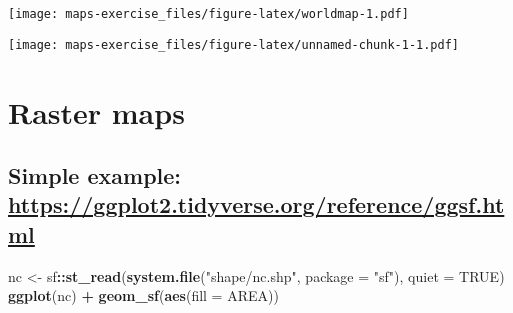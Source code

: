 \documentclass[
]{article}
\newenvironment{Shaded}{\begin{snugshade}}{\end{snugshade}}
\newcommand{\AttributeTok}[1]{\textcolor[rgb]{0.13,0.29,0.53}{#1}}
\newcommand{\CommentTok}[1]{\textcolor[rgb]{0.56,0.35,0.01}{\textit{#1}}}
\newcommand{\ConstantTok}[1]{\textcolor[rgb]{0.56,0.35,0.01}{#1}}
\newcommand{\FunctionTok}[1]{\textcolor[rgb]{0.13,0.29,0.53}{\textbf{#1}}}
\newcommand{\NormalTok}[1]{#1}
\newcommand{\OtherTok}[1]{\textcolor[rgb]{0.56,0.35,0.01}{#1}}
\newcommand{\SpecialCharTok}[1]{\textcolor[rgb]{0.81,0.36,0.00}{\textbf{#1}}}
\newcommand{\StringTok}[1]{\textcolor[rgb]{0.31,0.60,0.02}{#1}}
\begin{document}
\texttt{[image: maps-exercise\_files/figure-latex/worldmap-1.pdf]}

\begin{Shaded}
\end{Shaded}

\texttt{[image: maps-exercise\_files/figure-latex/unnamed-chunk-1-1.pdf]}

\hypertarget{raster-maps}{%
\section{Raster maps}\label{raster-maps}}

\hypertarget{simple-example-httpsggplot2.tidyverse.orgreferenceggsf.html}{%
\subsection{\texorpdfstring{Simple example:
\url{https://ggplot2.tidyverse.org/reference/ggsf.html}}{Simple example: https://ggplot2.tidyverse.org/reference/ggsf.html}}\label{simple-example-httpsggplot2.tidyverse.orgreferenceggsf.html}}

\begin{Shaded}
\begin{Highlighting}[]
\NormalTok{nc }\OtherTok{\textless{}{-}}\NormalTok{ sf}\SpecialCharTok{::}\FunctionTok{st\_read}\NormalTok{(}\FunctionTok{system.file}\NormalTok{(}\StringTok{"shape/nc.shp"}\NormalTok{, }\AttributeTok{package =} \StringTok{"sf"}\NormalTok{), }\AttributeTok{quiet =} \ConstantTok{TRUE}\NormalTok{)}
\FunctionTok{ggplot}\NormalTok{(nc) }\SpecialCharTok{+}
  \FunctionTok{geom\_sf}\NormalTok{(}\FunctionTok{aes}\NormalTok{(}\AttributeTok{fill =}\NormalTok{ AREA))}
\end{Highlighting}
\end{Shaded}
\end{document}
